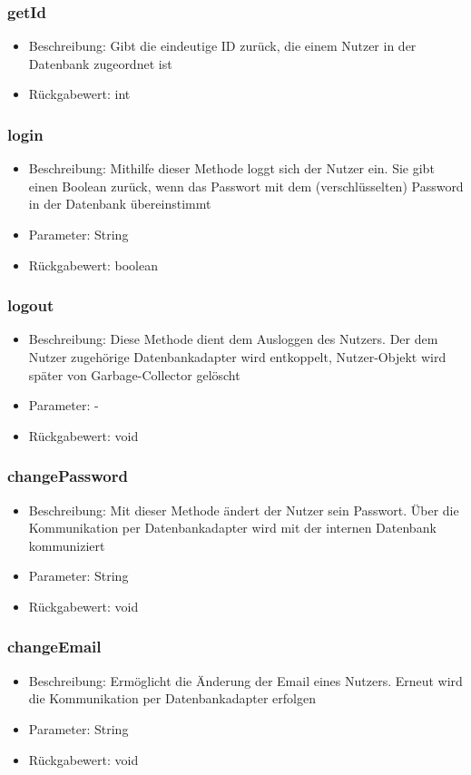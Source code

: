 \documentclass[a4paper]{scrreprt}
\begin{document}
    \subsubsection{getId}
    \begin{itemize}
        \item Beschreibung: Gibt die eindeutige ID zurück, die einem Nutzer in der Datenbank zugeordnet ist
        \item Rückgabewert: int
    \end{itemize}
    \subsubsection{login}
    \begin{itemize}
        \item Beschreibung: Mithilfe dieser Methode loggt sich der Nutzer ein. Sie gibt einen Boolean zurück, wenn das Passwort mit dem (verschlüsselten) Password in der Datenbank übereinstimmt
        \item Parameter: String
        \item Rückgabewert: boolean
    \end{itemize}
    \subsubsection{logout}
    \begin{itemize}
        \item Beschreibung: Diese Methode dient dem Ausloggen des Nutzers. Der dem Nutzer zugehörige Datenbankadapter wird entkoppelt, Nutzer-Objekt wird später von Garbage-Collector gelöscht
        \item Parameter: -
        \item Rückgabewert: void
    \end{itemize}
    \subsubsection{changePassword}
    \begin{itemize}
        \item Beschreibung: Mit dieser Methode ändert der Nutzer sein Passwort. Über die Kommunikation per Datenbankadapter wird mit der internen Datenbank kommuniziert
        \item Parameter: String
        \item Rückgabewert: void
    \end{itemize}
    \subsubsection{changeEmail}
    \begin{itemize}
        \item Beschreibung: Ermöglicht die Änderung der Email eines Nutzers. Erneut wird die Kommunikation per Datenbankadapter erfolgen
        \item Parameter: String
        \item Rückgabewert: void
    \end{itemize}
\end{document}
